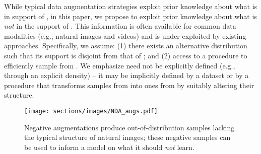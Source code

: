 \documentclass{article} \usepackage{iclr2021_conference,times}
\newtheorem{definition}{Definition}
\newcommand{\ayush}[1]{ \color{blue} [Ayush: #1] \color{black}}
\begin{document}
While typical data augmentation strategies exploit prior knowledge about what is in support of , 
in this paper, we propose to exploit prior knowledge about what is \emph{not} in the support of . This information is often available for common data modalities (e.g., natural images and videos) and is under-exploited by existing approaches. Specifically, we assume: (1) there exists an alternative distribution  such that its support is disjoint from that of ; and (2) access to a procedure to efficiently sample from . We emphasize  need not be explicitly defined (e.g., through an explicit density) -- it may be implicitly defined by a dataset or by a procedure 
that transforms
samples from 
 into ones from  by suitably altering their structure. 
\begin{comment}
We describe this as negative data augmentation (NDA), which is analogous to (positive) data augmentation where we exploit prior knowledge about what is in support of . 
In particular, NDA is described with the following (informal) definition:
\begin{definition}
\label{def:nda}
A negative data augmentation (NDA) strategy for a distribution  over  is an efficient procedure to sample from a distribution  over  with disjoint support from , where the distribution  should be restricted to an ``informative'' subset of the set of all distributions that are disjoint from . \ayush{included an extension}
\end{definition}
\end{comment}














 
 
 









\begin{figure*}[!h]
\centering
    \texttt{[image: sections/images/NDA\_augs.pdf]}
    \caption{
Negative augmentations produce out-of-distribution samples lacking the typical structure of natural images; these negative samples can be used to inform a model on what it should \emph{not} learn. 
    }
    \label{fig:types}
\end{figure*}
\end{document}
